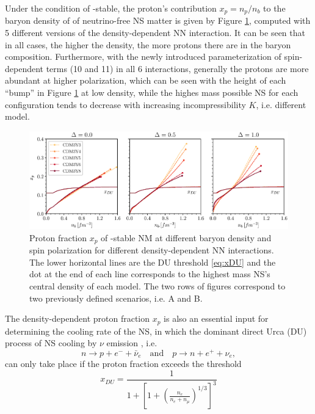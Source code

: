 Under the condition of \textbeta-stable, the proton's contribution $x_p = n_p/n_b$ to the baryon density of of neutrino-free \gls{NS} matter is given by Figure \ref{fig:xp}, computed with 5 different versions of the density-dependent \gls{NN} interaction. It can be seen that in all cases, the higher the density, the more protons there are in the baryon composition. Furthermore, with the newly introduced parameterization of spin-dependent terms (10 and 11) in all 6 interactions, generally the protons are more abundant at higher polarization, which can be seen with the height of each ``bump'' in Figure \ref{fig:xp} at low density, while the highes mass possible \gls{NS} for each configuration tends to decrease with increasing incompressibility $K$, i.e. different model.
\begin{figure}[ht!]
        \centering
        \includegraphics[width=\textwidth]{fig/xp.eps}
        \caption{Proton fraction $x_p$ of \textbeta-stable \gls{NM} at different baryon density and spin polarization for different density-dependent \gls{NN} interactions. The lower horizontal lines are the \gls{DU} threshold \eqref{eq:xDU} and the dot at the end of each line corresponds to the highest mass \gls{NS}'s central density of each model. The two rows of figures correspond to two previously defined scenarios, i.e. A and B.}
        \label{fig:xp}
\end{figure} 
The density-dependent proton fraction $x_p$ is also an essential input for determining the cooling rate of the \gls{NS}, in which the dominant direct Urca (\gls{DU}) process of \gls{NS} cooling by $\nu$ emission \citep{lattimer2004physics}, i.e.
\begin{equation}
    n \longrightarrow p + e^- +\bar{\nu}_e \quad\text{and}\quad p \longrightarrow n + e^+ + \nu_e,
\end{equation}
can only take place if the proton fraction exceeds the threshold \citep{loan2011equation}
\begin{equation}
    x_{DU} = \frac{1}{ 1 + \left[ 1 + \left( \frac{n_e}{n_e + n_\mu} \right)^{1/3} \right]^3 }
    \label{eq:xDU}
\end{equation}
